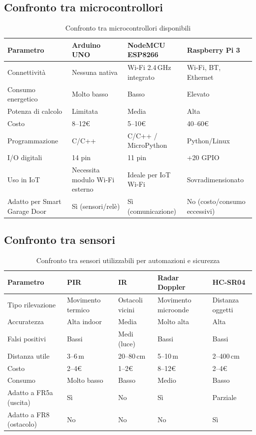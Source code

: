 \subsection{Confronto tra microcontrollori} 

\begin{table}[H] 
\centering 
\caption{Confronto tra microcontrollori disponibili} \label{tab:mcus} \begin{tabularx}{\textwidth}{@{}lXXX@{}} \toprule \textbf{Parametro} & \textbf{Arduino UNO} & \textbf{NodeMCU ESP8266} & \textbf{Raspberry Pi 3} \\ \midrule Connettività & Nessuna nativa & Wi-Fi 2.4\,GHz integrato & Wi-Fi, BT, Ethernet \\ Consumo energetico & Molto basso & Basso & Elevato \\ Potenza di calcolo & Limitata & Media & Alta \\ Costo & 8–12€ & 5–10€ & 40–60€ \\ Programmazione & C/C++ & C/C++ / MicroPython & Python/Linux \\ I/O digitali & 14 pin & 11 pin & +20 GPIO \\ Uso in IoT & Necessita modulo Wi-Fi esterno & Ideale per IoT Wi-Fi & Sovradimensionato \\ Adatto per Smart Garage Door & Sì (sensori/relè) & Sì (comunicazione) & No (costo/consumo eccessivi) \\ \bottomrule 
\end{tabularx} 
\end{table}

 \subsection{Confronto tra sensori} 
 
 \begin{table}[H] 
 \centering 
 \caption{Confronto tra sensori utilizzabili per automazioni e sicurezza} \label{tab:sensors} \begin{tabularx}{\textwidth}{@{}lXXXX@{}} \toprule \textbf{Parametro} & \textbf{PIR} & \textbf{IR} & \textbf{Radar Doppler} & \textbf{HC-SR04} \\ \midrule Tipo rilevazione & Movimento termico & Ostacoli vicini & Movimento microonde & Distanza oggetti \\ Accuratezza & Alta indoor & Media & Molto alta & Alta \\ Falsi positivi & Bassi & Medi (luce) & Bassi & Bassi \\ Distanza utile & 3–6\,m & 20–80\,cm & 5–10\,m & 2–400\,cm \\ Costo & 2–4€ & 1–2€ & 8–12€ & 2–4€ \\ Consumo & Molto basso & Basso & Medio & Basso \\ Adatto a FR5a (uscita) & Sì & No & Sì & Parziale \\ Adatto a FR8 (ostacolo) & No & No & No & Sì \\ 
 \bottomrule 
 \end{tabularx} 
 \end{table} 
 
